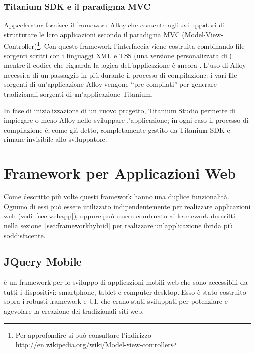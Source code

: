             \subsubsection{Titanium SDK e il paradigma MVC}
            \label{subsub:alloy}
                Appcelerator fornisce il frame\-work Alloy che consente agli
                sviluppatori di strutturare le loro applicazioni secondo il
                paradigma MVC (Model-View-Controller)\footnote{Per approfondire
                si può consultare l'indirizzo\\
                \url{http://en.wikipedia.org/wiki/Model-view-controller}}. Con
                questo frame\-work l'interfaccia viene costruita combinando file
                sorgenti scritti con i linguaggi XML e TSS (una versione personalizzata
                di \css{}) mentre il codice che
                riguarda la logica dell'applicazione è ancora \js{}.
                L'uso di Alloy necessita di un passaggio in più durante il
                processo di compilazione: i vari file sorgenti di
                un'applicazione Alloy vengono ``pre-compilati'' per generare
                tradizionali sorgenti \js{} di un'applicazione Titanium.

                In fase di inizializzazione di un nuovo progetto, Titanium Studio
                permette di impiegare o meno Alloy nello sviluppare
                l'applicazione; in ogni caso il processo di compilazione è, come
                già detto, completamente gestito da Titanium SDK e rimane
                invisibile allo sviluppatore.

    \section{Framework per Applicazioni Web}
    \label{sec:frameworkwebapp}

        Come descritto più volte questi frame\-work hanno una duplice funzionalità.
        Ognuno di essi può essere utilizzato indipendentemente per realizzare
        applicazioni web (\hyperref[sec:webapp]{vedi~\ref{sec:webapp}}), oppure
        può essere combinato ai frame\-work descritti nella
        sezione\hyperref[sec:frameworkhybrid]{~\ref{sec:frameworkhybrid}} per
        realizzare un'applicazione ibrida più soddisfacente.

        \subsection{JQuery Mobile}
        \label{subsec:jQuery}
            \jqm{} è un frame\-work per lo sviluppo di applicazioni mobili
            web che sono accessibili da tutti i dispositivi: smartphone, tablet
            e computer desktop. Esso è stato costruito sopra i robusti frame\-work
            \jq{} e \jq{} UI, che erano stati sviluppati per potenziare e
            agevolare la creazione dei tradizionali siti web.

